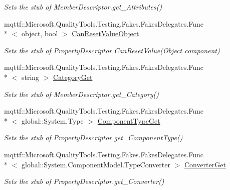 \begin{DoxyCompactItemize}
\begin{DoxyCompactList}\small\item\em Sets the stub of Member\-Descriptor.\-get\-\_\-\-Attributes()\end{DoxyCompactList}\item 
mqttf\-::\-Microsoft.\-Quality\-Tools.\-Testing.\-Fakes.\-Fakes\-Delegates.\-Func\\*
$<$ object, bool $>$ \hyperlink{class_system_1_1_component_model_1_1_fakes_1_1_stub_property_descriptor_a311c8a31d4141634ee5f48063f267d21}{Can\-Reset\-Value\-Object}
\begin{DoxyCompactList}\small\item\em Sets the stub of Property\-Descriptor.\-Can\-Reset\-Value(\-Object component)\end{DoxyCompactList}\item 
mqttf\-::\-Microsoft.\-Quality\-Tools.\-Testing.\-Fakes.\-Fakes\-Delegates.\-Func\\*
$<$ string $>$ \hyperlink{class_system_1_1_component_model_1_1_fakes_1_1_stub_property_descriptor_abdd85ca9413ba8181ad10a2ae23c8b45}{Category\-Get}
\begin{DoxyCompactList}\small\item\em Sets the stub of Member\-Descriptor.\-get\-\_\-\-Category()\end{DoxyCompactList}\item 
mqttf\-::\-Microsoft.\-Quality\-Tools.\-Testing.\-Fakes.\-Fakes\-Delegates.\-Func\\*
$<$ global\-::\-System.\-Type $>$ \hyperlink{class_system_1_1_component_model_1_1_fakes_1_1_stub_property_descriptor_aca3eccc07df44328abf6eb6a3750441e}{Component\-Type\-Get}
\begin{DoxyCompactList}\small\item\em Sets the stub of Property\-Descriptor.\-get\-\_\-\-Component\-Type()\end{DoxyCompactList}\item 
mqttf\-::\-Microsoft.\-Quality\-Tools.\-Testing.\-Fakes.\-Fakes\-Delegates.\-Func\\*
$<$ global\-::\-System.\-Component\-Model.\-Type\-Converter $>$ \hyperlink{class_system_1_1_component_model_1_1_fakes_1_1_stub_property_descriptor_a70f5d7979f5db32d3ab56748b610a778}{Converter\-Get}
\begin{DoxyCompactList}\small\item\em Sets the stub of Property\-Descriptor.\-get\-\_\-\-Converter()\end{DoxyCompactList}\item 

\end{DoxyCompactItemize}
